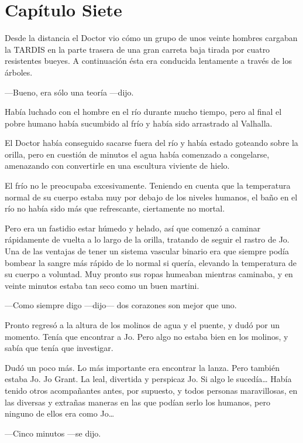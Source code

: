 \chapter*{Capítulo Siete}

Desde la distancia el Doctor vio cómo un grupo de unos veinte hombres
cargaban la TARDIS en la parte trasera de una gran carreta baja tirada
por cuatro resistentes bueyes. A continuación ésta era conducida
lentamente a través de los árboles.

---Bueno, era sólo una teoría ---dijo.

Había luchado con el hombre en el río durante mucho tiempo, pero al
final el pobre humano había sucumbido al frío y había sido arrastrado al
Valhalla.

El Doctor había conseguido sacarse fuera del río y había estado goteando
sobre la orilla, pero en cuestión de minutos el agua había comenzado a
congelarse, amenazando con convertirle en una escultura viviente de
hielo.

El frío no le preocupaba excesivamente. Teniendo en cuenta que la
temperatura normal de su cuerpo estaba muy por debajo de los niveles
humanos, el baño en el río no había sido más que refrescante,
ciertamente no mortal.

Pero era un fastidio estar húmedo y helado, así que comenzó a caminar
rápidamente de vuelta a lo largo de la orilla, tratando de seguir el
rastro de Jo. Una de las ventajas de tener un sistema vascular binario
era que siempre podía bombear la sangre más rápido de lo normal si
quería, elevando la temperatura de su cuerpo a voluntad. Muy pronto sus
ropas humeaban mientras caminaba, y en veinte minutos estaba tan seco
como un buen martini.

---Como siempre digo ---dijo--- dos corazones son mejor que uno.

Pronto regresó a la altura de los molinos de agua y el puente, y dudó
por un momento. Tenía que encontrar a Jo. Pero algo no estaba bien en
los molinos, y sabía que tenía que investigar.

Dudó un poco más. Lo más importante era encontrar la lanza. Pero también
estaba Jo. Jo Grant. La leal, divertida y perspicaz Jo. Si algo le
sucedía\ldots{} Había tenido otros acompañantes antes, por supuesto, y
todos personas maravillosas, en las diversas y extrañas maneras en las
que podían serlo los humanos, pero ninguno de ellos era como Jo\ldots{}

---Cinco minutos ---se dijo.

